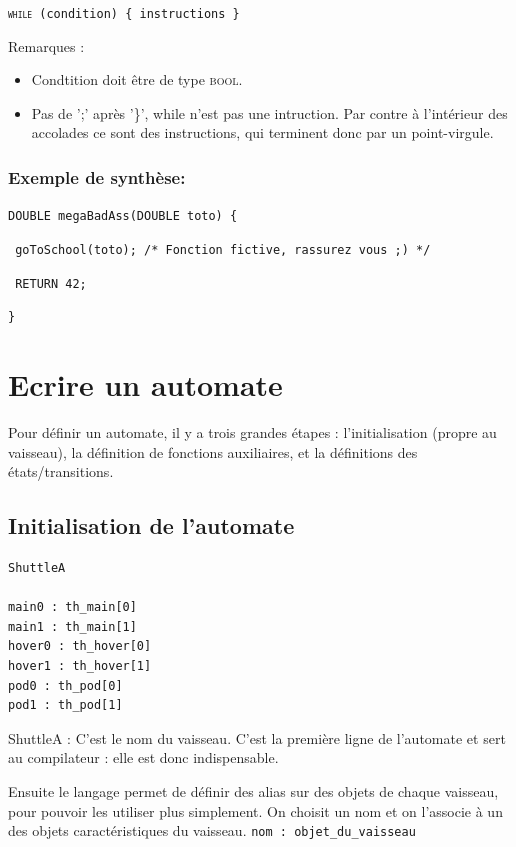 \documentclass[a4paper,11pt]{article}
\begin{document}
\texttt{\textsc{while} (condition) \{ instructions \} }

Remarques : 
\begin{itemize}
	\item Condtition doit être de type \textsc{bool}.
	\item Pas de ';' après '\}', while n'est pas une intruction. Par contre à l'intérieur des accolades ce sont des instructions, qui terminent donc par un point-virgule.
\end{itemize}

\subsubsection{Exemple de synthèse:}

\texttt{DOUBLE megaBadAss(DOUBLE toto) \{}

\texttt{	goToSchool(toto); /* Fonction fictive, rassurez vous ;) */}

\texttt{	RETURN 42;}

\texttt{\}}



\section{Ecrire un automate}
Pour définir un  automate, il y a trois grandes étapes : l'initialisation (propre au vaisseau), la définition de fonctions auxiliaires, et la définitions des états/transitions.

\subsection{Initialisation de l'automate}

\begin{verbatim}
ShuttleA

main0 : th_main[0]
main1 : th_main[1]
hover0 : th_hover[0]
hover1 : th_hover[1]
pod0 : th_pod[0]
pod1 : th_pod[1]
\end{verbatim}

ShuttleA : C'est le nom du vaisseau. C'est la première ligne de l'automate et sert au compilateur : elle est donc indispensable.

Ensuite le langage permet de définir des alias sur des objets de chaque vaisseau, pour pouvoir les utiliser plus simplement. On choisit un nom et on l'associe à un des objets caractéristiques du vaisseau. 
\texttt{nom : objet\_du\_vaisseau}
\end{document}
